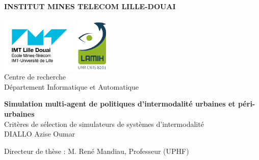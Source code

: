 
\begin{titlepage}

\centering

\vspace*{0.5cm}

{\large \textbf{INSTITUT MINES TELECOM LILLE-DOUAI}}\\
\centering{\rule{10cm}{0.5mm}}\\[1cm]
\noindent\mbox{\includegraphics[height=25mm]{Pictures/Logo/IMT-Lille-Douai-Logo.png}}\hfill
\mbox{\includegraphics[height=25mm]{Pictures/Logo/lamih-2015-308px.png}}\\[1cm]

{\Large Centre de recherche}\\[6pt]
{\Large Département Informatique et Automatique}\\[0.5cm]

\vspace{\fill}


{\LARGE \textbf{Simulation multi-agent de politiques d'intermodalité urbaines et péri-urbaines }}\\[0.5cm]

{\large Critères de sélection de simulateurs de systèmes d'intermodalité}\\[1cm]

{\large DIALLO Azise Oumar}\\[0.5cm]

\vspace{\fill}

\noindent\parbox{\textwidth}{Directeur de thèse : {\large M. René Mandiau}, Professeur (UPHF)}\\[0.5cm]


\end{titlepage}
